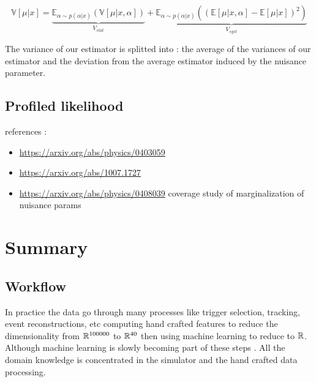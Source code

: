 \begin{equation}
\label{eq:stat_and_syst_variance_definition}
\mathbb{V}[\mu|x] 
	= \underbrace{\mathbb{E}_{\alpha \sim p(\alpha|x)} \left (\mathbb{V}[\mu|x, \alpha] \right )}_{V_{stat}} 
	+ \underbrace{\mathbb{E}_{\alpha \sim p(\alpha|x)} \left ( (\mathbb{E} [\mu|x, \alpha]  - \mathbb{E}[\mu|x])^2\right )}_{V_{syst}}
\end{equation}

The variance of our estimator is splitted into :
the average of the variances of our estimator and the deviation from the average estimator induced by the nuisance parameter.







\subsection{Profiled likelihood} %
\label{sub:profiled_likelihood}




references : 
\begin{itemize}
	\item \url{https://arxiv.org/abs/physics/0403059}
	\item \url{https://arxiv.org/abs/1007.1727}
	\item \url{https://arxiv.org/abs/physics/0408039} coverage study of marginalization of nuisance params
\end{itemize}




\section{Summary} %
\label{sec:summary}


\subsection{Workflow} %
\label{sub:workflow}


In practice the data go through many processes like trigger selection, tracking, event reconstructions, etc computing hand crafted features to reduce the dimensionality from $\mathbb{R}^{100 000}$ to $\mathbb{R}^{40}$ then using machine learning to reduce to $\mathbb{R}$.
Although machine learning is slowly becoming part of these steps \needcite.
All the domain knowledge is concentrated in the simulator and the hand crafted data processing.


